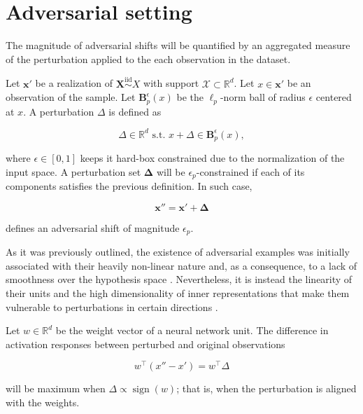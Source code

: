 \section{Adversarial setting}\label{sec:adversarial_setting}

The magnitude of adversarial shifts will be quantified by an aggregated
measure of the perturbation applied to the each observation in the dataset.

\begin{definition}\label{def:adversarial_perturbation}
    Let $\bm{x}'$ be a realization of $\bm{X} \overset{\text{iid}}{\sim} X$ with support $\mathcal{X} \subset \mathbb{R}^d$.
    Let $x \in \bm{x}'$ be an observation of the sample.
    Let $\mathbf{B}_p^\epsilon(x)$ be the $\ell_p$-norm ball of radius 
    $\epsilon$ centered at $x$. A perturbation $\Delta$ is defined as

    $$
        \Delta \in \mathbb{R}^d \text{ s.t. } x + \Delta \in \mathbf{B}_p^\epsilon(x),
    $$

    where $\epsilon \in [0, 1]$ keeps it hard-box constrained due to the
    normalization of the input space. A perturbation set $\bm{\Delta}$
    will be $\epsilon_p$-constrained if each of its components
    satisfies the previous definition. In such case,

    $$
        \bm{x}'' = \bm{x}' + \bm{\Delta}
    $$

    defines an adversarial shift of magnitude $\epsilon_p$.
\end{definition}

As it was previously outlined, the existence of adversarial
examples was initially associated with their heavily non-linear nature 
and, as a consequence, to a lack of smoothness over the hypothesis space
\cite{szegedyIntriguingPropertiesNeural2014}.
Nevertheless, it is instead the linearity of their units and the high 
dimensionality of inner representations that make them vulnerable
to perturbations in certain directions
\cite{goodfellowExplainingHarnessingAdversarial2015}.\\

\begin{example}
Let $w \in \mathbb{R}^d$ be the weight vector of a neural network unit.
The difference in activation responses between perturbed and original
observations

$$
w^\top (x'' - x') = w^\top \Delta
$$

will be maximum when $\Delta \propto \operatorname{sign}(w)$; that is,
when the perturbation is aligned with the weights. 
\end{example}

